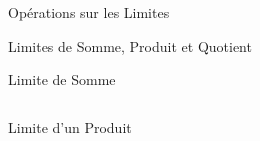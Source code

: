 \documentclass{coursbook}
\begin{document}
\begin{Gpartie}{Opérations sur les Limites}
\begin{Spartie}{Limites de Somme, Produit et Quotient}
\begin{SSpartie}{Limite de Somme}
\begin{table}[H]
{\begin{tabular}{ p{0.15\linewidth} *{3}{M{0.17\linewidth}} }
                        \end{tabular}
                    }
                \end{table}
            \end{SSpartie}
            \begin{SSpartie}{Limite d'un Produit} 
                \begin{table}[H]
                    \centering {}
\end{table}
\end{SSpartie}
\end{Spartie}
\end{Gpartie}
\end{document}
